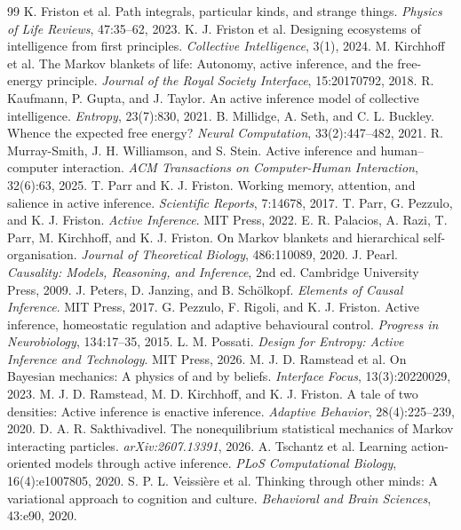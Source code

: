 \documentclass[11pt,a4paper]{article}
\numberwithin{equation}{section}
\begin{document}
\begin{thebibliography}{99}
 K. Friston et al. Path integrals, particular kinds, and strange things. \emph{Physics of Life Reviews}, 47:35--62, 2023.
 K. J. Friston et al. Designing ecosystems of intelligence from first principles. \emph{Collective Intelligence}, 3(1), 2024.
 M. Kirchhoff et al. The Markov blankets of life: Autonomy, active inference, and the free-energy principle. \emph{Journal of the Royal Society Interface}, 15:20170792, 2018.
 R. Kaufmann, P. Gupta, and J. Taylor. An active inference model of collective intelligence. \emph{Entropy}, 23(7):830, 2021.
 B. Millidge, A. Seth, and C. L. Buckley. Whence the expected free energy? \emph{Neural Computation}, 33(2):447--482, 2021.
 R. Murray-Smith, J. H. Williamson, and S. Stein. Active inference and human--computer interaction. \emph{ACM Transactions on Computer-Human Interaction}, 32(6):63, 2025.
 T. Parr and K. J. Friston. Working memory, attention, and salience in active inference. \emph{Scientific Reports}, 7:14678, 2017.
 T. Parr, G. Pezzulo, and K. J. Friston. \emph{Active Inference}. MIT Press, 2022.
 E. R. Palacios, A. Razi, T. Parr, M. Kirchhoff, and K. J. Friston. On Markov blankets and hierarchical self-organisation. \emph{Journal of Theoretical Biology}, 486:110089, 2020.
 J. Pearl. \emph{Causality: Models, Reasoning, and Inference}, 2nd ed. Cambridge University Press, 2009.
 J. Peters, D. Janzing, and B. Sch\"olkopf. \emph{Elements of Causal Inference}. MIT Press, 2017.
 G. Pezzulo, F. Rigoli, and K. J. Friston. Active inference, homeostatic regulation and adaptive behavioural control. \emph{Progress in Neurobiology}, 134:17--35, 2015.
 L. M. Possati. \emph{Design for Entropy: Active Inference and Technology}. MIT Press, 2026.
 M. J. D. Ramstead et al. On Bayesian mechanics: A physics of and by beliefs. \emph{Interface Focus}, 13(3):20220029, 2023.
 M. J. D. Ramstead, M. D. Kirchhoff, and K. J. Friston. A tale of two densities: Active inference is enactive inference. \emph{Adaptive Behavior}, 28(4):225--239, 2020.
 D. A. R. Sakthivadivel. The nonequilibrium statistical mechanics of Markov interacting particles. \emph{arXiv:2607.13391}, 2026.
 A. Tschantz et al. Learning action-oriented models through active inference. \emph{PLoS Computational Biology}, 16(4):e1007805, 2020.
 S. P. L. Veissi\`ere et al. Thinking through other minds: A variational approach to cognition and culture. \emph{Behavioral and Brain Sciences}, 43:e90, 2020.
\end{thebibliography}
\end{document}
